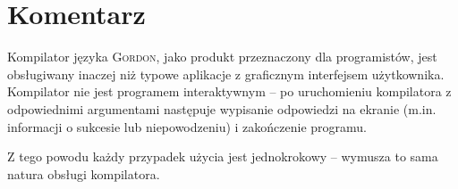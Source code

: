 \documentclass{documentation}
\begin{document}
\section{Komentarz}
\noindent Kompilator języka \textsc{Gordon}, jako produkt przeznaczony dla
programistów, jest obsługiwany inaczej niż typowe aplikacje z graficznym
interfejsem użytkownika.  Kompilator nie jest programem interaktywnym -- po
uruchomieniu kompilatora z odpowiednimi argumentami następuje wypisanie
odpowiedzi na ekranie (m.in.  informacji o sukcesie lub niepowodzeniu) i
zakończenie programu.

Z tego powodu każdy przypadek użycia jest jednokrokowy -- wymusza to sama
natura obsługi kompilatora.
\end{document}
